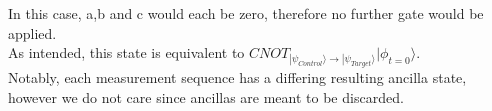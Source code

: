 In this case, a,b and c would each be zero, therefore no further gate would be applied.\\
As intended, this state is equivalent to 
$CNOT_{|\psi_{Control}\rangle\rightarrow |\psi_{Target}\rangle} |\phi_{t=0}\rangle$.
\\
Notably, each measurement sequence has a differing resulting ancilla state, 
however we do not care since ancillas are meant to be discarded.
